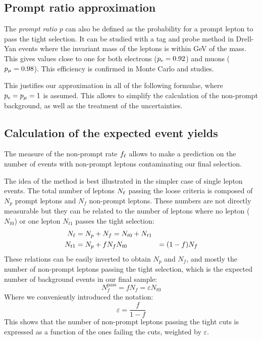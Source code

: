 \subsection{Prompt ratio approximation}
The \emph{prompt ratio} $p$ can also be defined as the probability for
a prompt lepton to pass the tight selection. It can be studied with a tag
and probe method in Drell-Yan events where the invariant mass of the leptons
is within \unit[10]{GeV} of the \Z mass. This gives values close to one for
both electrons ($p_{\mathrm{e}} = 0.92$) and muons ($p_{\mu} = 0.98$). This efficiency is
confirmed in Monte Carlo \Z and \W studies.

This justifies our approximation in all of the following formulae, where
$p_{\mathrm{e}} = p_{\mu} = 1$ is assumed.
This allows to simplify the calculation of the non-prompt background, as
well as the treatment of the uncertainties.

\subsection{Calculation of the expected event yields}
The measure of the non-prompt rate $f_{\mathrm{\ell}}$ allows to make a prediction on
the number of events with non-prompt leptons contaminating our final
selection.

The idea of the method is best illustrated in the simpler case of single lepton
events.
The total number of leptons $N_{\mathrm{\ell}}$ passing the loose criteria is composed
of $N_p$ prompt leptons and $N_f$ non-prompt leptons. These numbers are not
directly measurable but they can be related to the number of leptons where
no lepton ($N_{t0}$) or one lepton $N_{t1}$ passes the tight selection:
\begin{align*}
    N_{\mathrm{\ell}} &= N_p + N_f = N_{t0} + N_{t1}\\
    N_{t1} &= N_p + fN_f
    N_{t0} &= (1 - f) N_f\\
\end{align*}
These relations can be easily inverted to obtain $N_p$ and $N_f$, and mostly
the number of non-prompt leptons passing the tight selection, which is the
expected number of background events in our final sample:
\begin{equation*}
    N_f^\text{pass} = fN_f = \varepsilon N_{t0}
\end{equation*}
Where we conveniently introduced the notation:
\begin{equation*}
    \varepsilon = \dfrac{f}{1 - f}
\end{equation*}
This shows that the number of non-prompt leptons passing the tight cuts is
expressed as a function of the ones failing the cuts, weighted by
$\varepsilon$.

